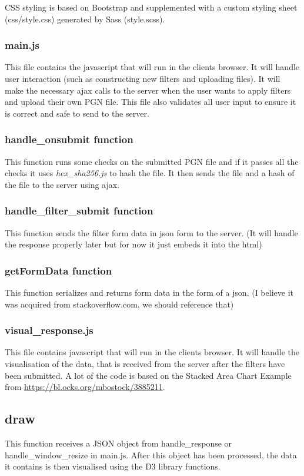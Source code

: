 \documentclass{article}
\begin{document}
CSS styling is based on Bootstrap and supplemented with a custom styling sheet (css/style.css) generated by Sass (style.scss).  


\subsubsection{main.js}
This file contains the javascript that will run in the clients browser. It will handle user interaction (such as constructing new filters and uploading files). It will make the necessary ajax calls to the server when the user wants to apply filters and upload their own PGN file. This file also validates all user input to ensure it is correct and safe to send to the server.

\subsubsection*{handle\_onsubmit function}
This function runs some checks on the submitted PGN file and if it passes all the checks it uses \textit{hex\_sha256.js} to hash the file. It then sends the file and a hash of the file to the server using ajax.


\subsubsection*{handle\_filter\_submit function}
This function sends the filter form data in json form to the server. (It will handle the response properly later but for now it just embeds it into the html)


\subsubsection*{getFormData function}
This function serializes and returns form data in the form of a json. (I believe it was acquired from stackoverflow.com, we should reference that)

\subsubsection{visual\_response.js}
This file contains javascript that will run in the clients browser. It will handle the visualisation of the data, that is received from the server after
the filters have been submitted. A lot of the code is based on the Stacked Area
Chart Example from \url{https://bl.ocks.org/mbostock/3885211}.

\subsection*{draw}
This function receives a JSON object from handle\_response or handle\_window\_resize in main.js. After this object has been processed, the data it contains is then visualised using the D3 library functions.
\end{document}
